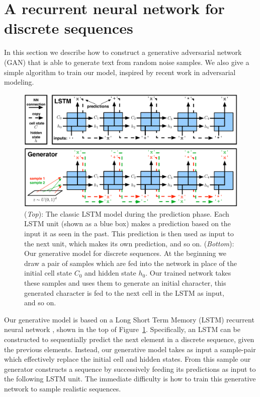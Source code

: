 \section{A recurrent neural network for discrete sequences}
In this section we describe how to construct a generative adversarial network (GAN) that is able to generate text from random noise samples. We also give a simple algorithm to train our model, inspired by recent work in adversarial modeling.

\begin{figure}[t!]
\begin{center}
\centerline{\includegraphics[width=\textwidth]{lstm_gan.pdf}}
\caption{(\emph{Top}): The classic LSTM model during the prediction phase. Each LSTM unit (shown as a blue box) makes a prediction based on the input it as seen in the past. This prediction is then used as input to the next unit, which makes its own prediction, and so on. (\emph{Bottom}): Our generative model for discrete sequences. At the beginning we draw a pair of samples which are fed into the network in place of the initial cell state $C_0$ and hidden state $h_0$. Our trained network takes these samples and uses them to generate an initial character, this generated character is fed to the next cell in the LSTM as input, and so on.}
\label{figure.prediction}
\end{center}
\end{figure}



Our generative model is based on a Long Short Term Memory (LSTM) recurrent neural network \cite{hochreiter1997long}, shown in the top of Figure~\ref{figure.prediction}. Specifically, an LSTM can be constructed to sequentially predict the next element in a discrete sequence, given the previous elements. Instead, our generative model takes as input a sample-pair which effectively replace the initial cell and hidden states. From this sample our generator constructs a sequence by successively feeding its predictions as input to the following LSTM unit. The immediate difficulty is how to train this generative network to sample realistic sequences.

